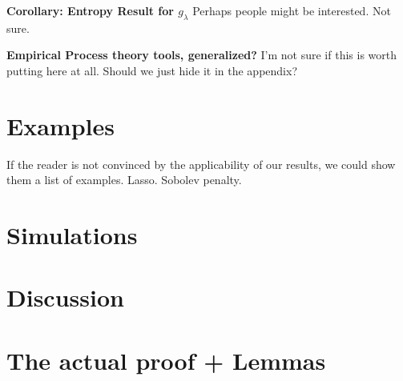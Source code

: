 \documentclass[12pt]{article}
\begin{document}
\textbf{Corollary: Entropy Result for $g_\lambda$}
Perhaps people might be interested. Not sure.

\textbf{Empirical Process theory tools, generalized?}
I'm not sure if this is worth putting here at all. Should we just hide it in the appendix?

\section{Examples}
If the reader is not convinced by the applicability of our results, we could show them a list of examples. Lasso. Sobolev penalty.

\section{Simulations}

\section{Discussion}

\section{The actual proof + Lemmas}

\bigskip
\end{document}
